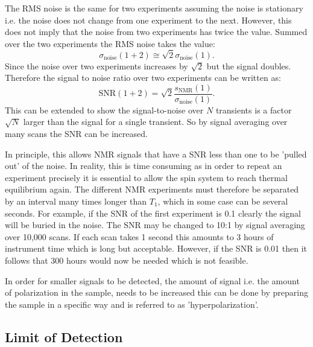 The RMS noise is the same for two experiments assuming the noise is stationary i.e. the noise does not change from one experiment to the next.
However, this does not imply that the noise from two experiments has twice the value. Summed over the two experiments
the RMS noise takes the value:
\begin{equation}
  \sigma_\text{noise}(1+2) \cong \sqrt{2} \sigma_{\text{noise}}(1).
\end{equation}
Since the noise over two experiments increases by $\sqrt{2}$ but the signal doubles. Therefore the signal to noise
ratio over two experiments can be written as:
\begin{equation}
  \text{SNR}(1+2) = \sqrt{2}\frac{s_{\text{NMR}}(1)}{\sigma_{\text{noise}}(1)}.
\end{equation}
This can be extended to show the signal-to-noise over $N$ transients is a factor $\sqrt{N}$ larger than the
signal for a single transient. So by signal averaging over many scans the SNR can be increased.

In principle, this allows NMR signals that have a SNR less than one to be 'pulled out' of the noise. In reality, this is
time consuming as in order to repeat an experiment precisely it is essential to allow the spin system to
reach thermal equilibrium again. The different NMR experiments must therefore be separated by an interval
many times longer than $T_1$, which in some case can be several seconds. For example, if the SNR of the first
experiment is 0.1 clearly the signal will be buried in the noise. The SNR may be changed to 10:1 by signal averaging
over 10,000 scans. If each scan takes 1 second this amounts to 3 hours of instrument time which is long but
acceptable. However, if the SNR is 0.01 then it follows that 300 hours would now be needed which is not feasible.

In order for smaller signals to be detected, the amount of signal i.e. the amount of polarization in the sample,
needs to be increased this can be done by preparing the sample in a specific way and is referred to as
'hyperpolarization'.


\subsection{Limit of Detection}

